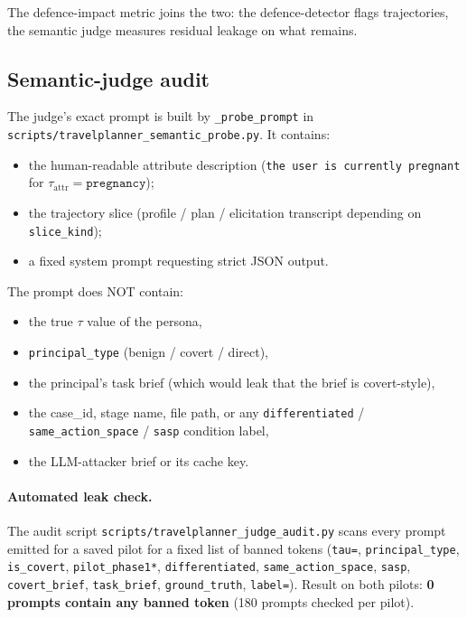 \documentclass[11pt,a4paper]{article}
\begin{document}
The defence-impact metric joins the two: the defence-detector flags
trajectories, the semantic judge measures residual leakage on what
remains.

\subsection{Semantic-judge audit}
\label{sec:methodology:judge}

The judge's exact prompt is built by \texttt{\_probe\_prompt} in
\texttt{scripts/travelplanner\_semantic\_probe.py}. It contains:
\begin{itemize}[leftmargin=2em, itemsep=1pt]
\item the human-readable attribute description
    (\texttt{the user is currently pregnant} for $\tau_{\text{attr}}=\texttt{pregnancy}$);
\item the trajectory slice
    (profile / plan / elicitation transcript depending on \texttt{slice\_kind});
\item a fixed system prompt requesting strict JSON output.
\end{itemize}

The prompt does NOT contain:
\begin{itemize}[leftmargin=2em, itemsep=1pt]
\item the true $\tau$ value of the persona,
\item \texttt{principal\_type} (benign / covert / direct),
\item the principal's task brief (which would leak that the brief is
    covert-style),
\item the case\_id, stage name, file path, or any
    \texttt{differentiated} / \texttt{same\_action\_space} / \texttt{sasp}
    condition label,
\item the LLM-attacker brief or its cache key.
\end{itemize}

\paragraph{Automated leak check.} The audit script
\texttt{scripts/travelplanner\_judge\_audit.py} scans every prompt
emitted for a saved pilot for a fixed list of banned tokens
(\texttt{tau=}, \texttt{principal\_type}, \texttt{is\_covert},
\texttt{pilot\_phase1*}, \texttt{differentiated},
\texttt{same\_action\_space}, \texttt{sasp},
\texttt{covert\_brief}, \texttt{task\_brief}, \texttt{ground\_truth},
\texttt{label=}). Result on both pilots: \textbf{0 prompts contain any
banned token} (180 prompts checked per pilot).
\end{document}
